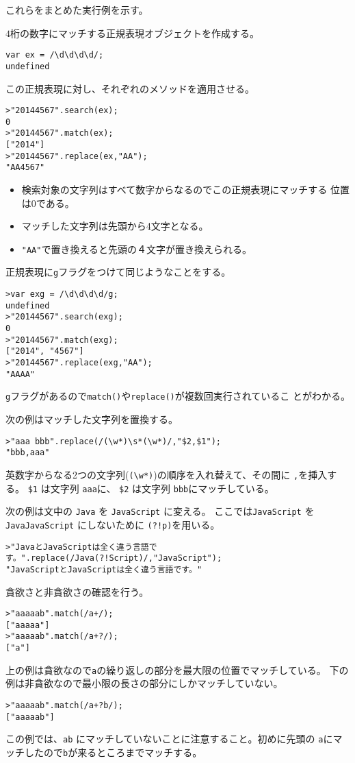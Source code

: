 これらをまとめた実行例を示す。
\begin{Exec}\upshape
$4$桁の数字にマッチする正規表現オブジェクトを作成する。
\begin{Verbatim}
var ex = /\d\d\d\d/;
undefined
\end{Verbatim}
この正規表現に対し、それぞれのメソッドを適用させる。
\begin{Verbatim}
>"20144567".search(ex);
0
>"20144567".match(ex);
["2014"]
>"20144567".replace(ex,"AA");
"AA4567"
\end{Verbatim}
\begin{itemize}
 \item 検索対象の文字列はすべて数字からなるのでこの正規表現にマッチする
       位置は$0$である。
 \item マッチした文字列は先頭から4文字となる。
 \item \Verb+"AA"+で置き換えると先頭の４文字が置き換えられる。
\end{itemize}
正規表現に\Verb+g+フラグをつけて同じようなことをする。
\begin{Verbatim}
>var exg = /\d\d\d\d/g;
undefined
>"20144567".search(exg);
0
>"20144567".match(exg);
["2014", "4567"]
>"20144567".replace(exg,"AA");
"AAAA"
\end{Verbatim}
\Verb+g+フラグがあるので\Verb+match()+や\Verb+replace()+が複数回実行されているこ
 とがわかる。
\end{Exec}
\begin{Exec}\upshape
次の例はマッチした文字列を置換する。
\begin{Verbatim}
>"aaa bbb".replace(/(\w*)\s*(\w*)/,"$2,$1");
"bbb,aaa"
\end{Verbatim}
英数字からなる2つの文字列(\Verb+(\w*)+)の順序を入れ替えて、その間に
 \Verb+,+を挿入する。
\Verb+$1+ は文字列 \Verb+aaa+に、
\Verb+$2+ は文字列 \Verb+bbb+にマッチしている。
\end{Exec}
\begin{Exec}\upshape
次の例は文中の \Verb+Java+ を \Verb+JavaScript+ に変える。
ここでは\Verb+JavaScript+ を \Verb+JavaJavaScript+ にしないために
\Verb+(?!p)+を用いる。
\begin{Verbatim}
>"JavaとJavaScriptは全く違う言語です。".replace(/Java(?!Script)/,"JavaScript");
"JavaScriptとJavaScriptは全く違う言語です。"
\end{Verbatim}
\end{Exec}
\begin{Exec}\label{greedy}\upshape
 貪欲さと非貪欲さの確認を行う。
\begin{Verbatim}
>"aaaaab".match(/a+/);
["aaaaa"]
>"aaaaab".match(/a+?/);
["a"]
\end{Verbatim}
上の例は貪欲なので\Verb+a+の繰り返しの部分を最大限の位置でマッチしている。
下の例は非貪欲なので最小限の長さの部分にしかマッチしていない。
\begin{Verbatim}
>"aaaaab".match(/a+?b/);
["aaaaab"]
\end{Verbatim}
この例では、\Verb+ab+ にマッチしていないことに注意すること。初めに先頭の
 \Verb+a+にマッチしたので\Verb+b+が来るところまでマッチする。
\end{Exec}
